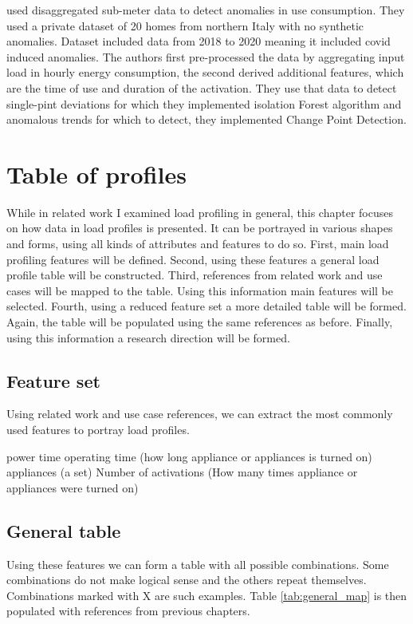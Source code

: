\cite{Castangia2021} used disaggregated sub-meter data to detect anomalies in use consumption.
They used a private dataset of 20 homes from northern Italy with no synthetic anomalies. 
Dataset included data from 2018 to 2020 meaning it included covid induced anomalies. 
The authors first pre-processed the data by aggregating input load in hourly energy consumption, 
the second derived additional features, which are the time of use and duration of the activation.
They use that data to detect single-pint deviations for which they implemented isolation Forest algorithm and
anomalous trends for which to detect, they implemented Change Point Detection. 


\section{Table of profiles}

While in related work I examined load profiling in general,
this chapter focuses on how data in load profiles is presented.  
It can be portrayed in various shapes and forms,
using all kinds of attributes and features to do so. 
First, main load profiling features will be defined.
Second, using these features a general load profile table will be constructed.
Third, references from related work and use cases will be mapped to the table.
Using this information main features will be selected.
Fourth, using a reduced feature set a more detailed table will be formed.
Again, the table will be populated using the same references as before.
Finally, using this information a research direction will be formed.

\subsection{Feature set} \label{sec:feature_set}

Using related work and use case references,
we can extract the most commonly used features to portray load profiles.

\begin{outline}
    \1 power
    \1 time
    \1 operating time (how long appliance or appliances is turned on)
    \1 appliances (a set)
    \1 Number of activations (How many times appliance or appliances were turned on)
\end{outline}

\subsection{General table}
Using these features we can form a table with all possible combinations.
Some combinations do not make logical sense and the others repeat themselves.
Combinations marked with X are such examples.
Table \ref{tab:general_map} is then populated with references from previous chapters.

